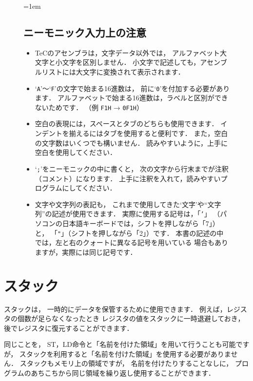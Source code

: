 \begin{figure}[btp]
\begin{framed}{\parindent=1em
\subsection*{ニーモニック入力上の注意}

\begin{itemize}
\item TeCのアセンブラは，文字データ以外では，
アルファベット大文字と小文字を区別しません．
小文字で記述しても，アセンブルリストには大文字に変換されて表示されます．
\item `{\tt A}'〜`{\tt F}'の文字で始まる16進数は，
前に`{\tt 0}'を付加する必要があります．
アルファベットで始まる16進数は，ラベルと区別ができないためです．
（例 {\tt F1H} → {\tt 0F1H}）
\item 空白の表現には，スペースとタブのどちらも使用できます．
インデントを揃えるにはタブを使用すると便利です．
また，空白の文字数はいくつでも構いません．
読みやすいように，上手に空白を使用してください．
\item `{\tt ;}'をニーモニックの中に書くと，
次の文字から行末までが注釈（コメント）になります．
上手に注釈を入れて，読みやすいプログラムにしてください．
\item 文字や文字列の表記も，
これまで使用してきた`文字'や``文字列''の記述が使用できます．
実際に使用する記号は，「{\tt '}」
（パソコンの日本語キーボードでは，シフトを押しながら「7」）と，
「{\tt "}」（シフトを押しながら「2」）です．
本書の記述の中では，左と右のクォートに異なる記号を用いている
場合もありますが，実際には同じ記号です．
\end{itemize}
}\end{framed}
\end{figure}

\newpage
\section{スタック}

スタックは，
一時的にデータを保管するために使用できます．
例えば，レジスタの個数が足らなくなったとき
レジスタの値をスタックに一時退避しておき，
後でレジスタに復元することができます．

同じことを，
ST，LD命令と「名前を付けた領域」を用いて行うことも可能ですが，
スタックを利用すると「名前を付けた領域」を使用する必要がありません．
スタックもメモリ上の領域ですが，
名前を付けたりすることなしに，
プログラムのあちこちから同じ領域を繰り返し使用することができます．


